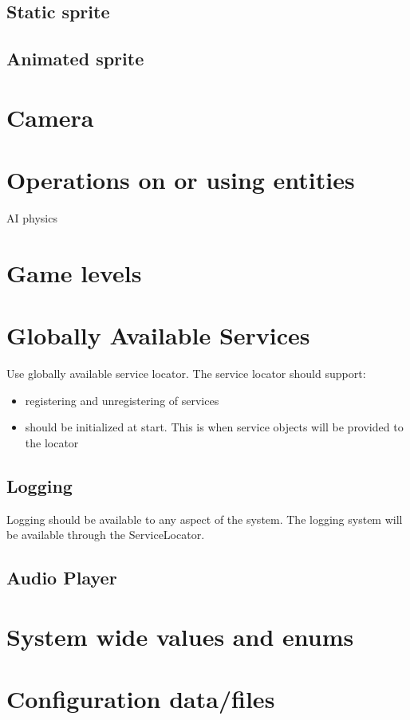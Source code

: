 \documentclass[12pt]{article}
\begin{document}
\subsection{Static sprite }
\subsection{Animated sprite }


\section{ Camera} \label{sec:Camera}

\section{	Operations on or using entities}
		AI
		physics

\section{	Game levels}

\section{ Globally Available Services}
Use globally available service locator.  The service locator should support:
\begin{itemize}
	\item registering and unregistering of services
	\item should be initialized at start.  This is when service objects will be provided to the locator
\end{itemize}

\subsection{ Logging }
Logging should be available to any aspect of the system.  The logging system will be available through the ServiceLocator.  
\subsection{ Audio Player} 

\section{	System wide values and enums}

\section{	Configuration data/files}
\end{document}

